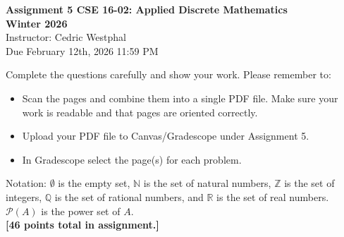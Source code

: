 \documentclass{article}
\begin{document}
\begin{centering}

\textbf{\large Assignment 5 CSE 16-02: Applied Discrete Mathematics}\\


\textbf{\large Winter 2026}\\
Instructor: Cedric Westphal  \\
Due February 12th, 2026 11:59 PM\\

\end{centering}

\vspace{12pt}
\noindent Complete the questions carefully and show your work. Please remember to:
\begin{itemize}
	\item Scan the pages and combine them into a single PDF file. Make sure your work is readable and that pages are oriented correctly.
	\item Upload your PDF file to Canvas/Gradescope under Assignment 5.
	\item In Gradescope select the page(s) for each problem.
\end{itemize}

\noindent Notation: $\emptyset$ is the empty set, $\mathbb{N}$ is the set of natural numbers, $\mathbb{Z}$ is the set of integers, $\mathbb{Q}$ is the set of rational numbers, and $\mathbb{R}$ is the set of real numbers. $\mathscr{P}(A)$ is the power set of $A$.\\
\textbf{[46 points total in assignment.]}
\end{document}
